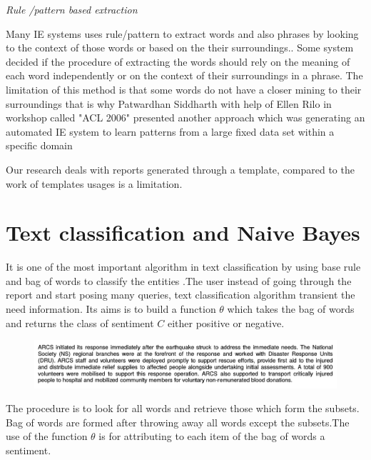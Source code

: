 \textit{Rule /pattern based extraction}

Many IE systems uses rule/pattern to extract words and also phrases by looking to the context of those words or based on the their surroundings.\citep{califf2003bottom}. Some system decided if the procedure of extracting the words should rely on the meaning of each word independently or on the context of their surroundings in a phrase.
The limitation of this method is that some words do not have a closer mining to their surroundings that is why Patwardhan Siddharth with help of Ellen Rilo  in workshop called "ACL 2006" presented another approach which  was  generating an automated IE system to learn patterns from a large fixed data set  within a specific domain \citep{patwardhan2007effective} 

Our research deals with reports generated through a template, compared to the work of  \citep{patwardhan2007effective} templates usages is a limitation.

\section{Text classification and Naive Bayes}


It is one of the most important algorithm in text classification by using base rule and bag of words to classify the entities \citep{manning2012information}.The user instead of going through the report and start posing many queries, text classification algorithm transient the need information.
Its aims is to build a function $\theta$ which takes the bag of words and returns the class of sentiment $C$ either positive or negative.

{\centering{$\theta$}

\centering{$\Updownarrow$}   

\begin{figure}[hbtp]
\centering
\includegraphics[scale=0.4]{images/report.png}\label{report}
\end{figure}

{\centering{$\Updownarrow$}}

{}

The procedure is to look for all words and retrieve those which form the subsets.  Bag of words are formed after throwing away  all words except the subsets.The use of the function $\theta$  is for  attributing  to each item of the bag of words a sentiment.}

